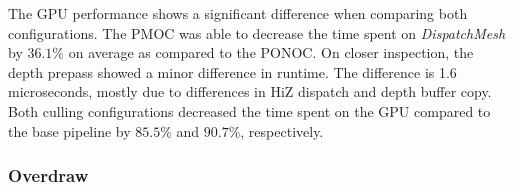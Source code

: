 \noindent
The \ac{GPU} performance shows a significant difference when comparing both configurations. The \ac{PMOC} 
was able to decrease the time spent on \emph{DispatchMesh} by $36.1\%$ on average as compared to the 
\ac{PONOC}. On closer inspection, the depth prepass showed a minor difference in runtime. The difference 
is 1.6 microseconds, mostly due to differences in \ac{HiZ} dispatch and depth buffer copy. \\

\noindent
Both culling configurations decreased the time spent on the \ac{GPU} compared to the base pipeline by 
$85.5\%$ and $90.7\%$, respectively.

\subsubsection*{Overdraw} \label{subsubsec-overdraw-bunny}

